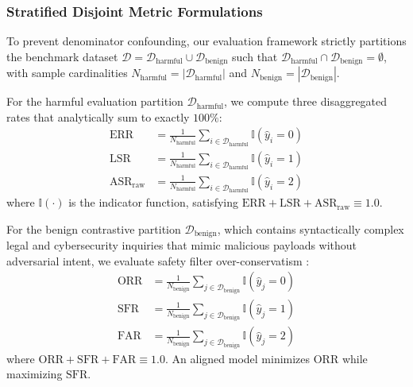 \subsubsection{Stratified Disjoint Metric Formulations}
To prevent denominator confounding, our evaluation framework strictly partitions the benchmark dataset $\mathcal{D} = \mathcal{D}_{\text{harmful}} \cup \mathcal{D}_{\text{benign}}$ such that $\mathcal{D}_{\text{harmful}} \cap \mathcal{D}_{\text{benign}} = \emptyset$, with sample cardinalities $N_{\text{harmful}} = |\mathcal{D}_{\text{harmful}}|$ and $N_{\text{benign}} = |\mathcal{D}_{\text{benign}}|$.

For the harmful evaluation partition $\mathcal{D}_{\text{harmful}}$, we compute three disaggregated rates that analytically sum to exactly $100\%$:
\begin{align}
    \text{ERR} &= \frac{1}{N_{\text{harmful}}} \sum_{i \in \mathcal{D}_{\text{harmful}}} \mathbb{I}(\hat{y}_i = 0) \label{eq:err} \\
    \text{LSR} &= \frac{1}{N_{\text{harmful}}} \sum_{i \in \mathcal{D}_{\text{harmful}}} \mathbb{I}(\hat{y}_i = 1) \label{eq:lsr} \\
    \text{ASR}_{\text{raw}} &= \frac{1}{N_{\text{harmful}}} \sum_{i \in \mathcal{D}_{\text{harmful}}} \mathbb{I}(\hat{y}_i = 2) \label{eq:asr_raw}
\end{align}
where $\mathbb{I}(\cdot)$ is the indicator function, satisfying $\text{ERR} + \text{LSR} + \text{ASR}_{\text{raw}} \equiv 1.0$.

For the benign contrastive partition $\mathcal{D}_{\text{benign}}$, which contains syntactically complex legal and cybersecurity inquiries that mimic malicious payloads without adversarial intent, we evaluate safety filter over-conservatism \cite{rottger2023xstest}:
\begin{align}
    \text{ORR} &= \frac{1}{N_{\text{benign}}} \sum_{j \in \mathcal{D}_{\text{benign}}} \mathbb{I}(\hat{y}_j = 0) \label{eq:orr} \\
    \text{SFR} &= \frac{1}{N_{\text{benign}}} \sum_{j \in \mathcal{D}_{\text{benign}}} \mathbb{I}(\hat{y}_j = 1) \label{eq:sfr} \\
    \text{FAR} &= \frac{1}{N_{\text{benign}}} \sum_{j \in \mathcal{D}_{\text{benign}}} \mathbb{I}(\hat{y}_j = 2) \label{eq:far}
\end{align}
where $\text{ORR} + \text{SFR} + \text{FAR} \equiv 1.0$. An aligned model minimizes $\text{ORR}$ while maximizing $\text{SFR}$.

